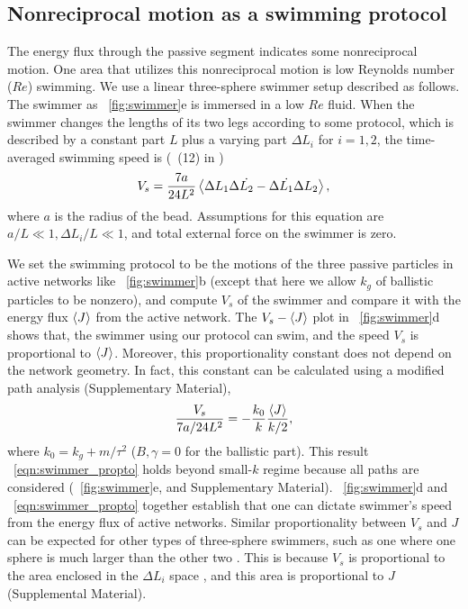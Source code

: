 \documentclass[
 preprint,
 preprintnumbers,
 amsmath,amssymb,
 aps,
 pre,
 longbibliography,
 superscriptaddress,
 10pt, twocolumn
]{revtex4-1}
\begin{document}
\subsection{Nonreciprocal motion as a swimming protocol}
The energy flux through the passive segment indicates some nonreciprocal motion. One area that utilizes this nonreciprocal motion is low Reynolds number ($Re$) swimming.
We use a linear three-sphere swimmer setup \cite{Golestanian2008AnalyticResults} described as follows. The swimmer as \figurename~\ref{fig:swimmer}e is immersed in a low $Re$ fluid. When the swimmer changes the lengths of its two legs according to some protocol, which is described by a constant part $L$ plus a varying part $\Delta L_i$ for $i=1,2$, the time-averaged swimming speed is (\eqnname~(12) in \cite{Golestanian2008AnalyticResults})
\begin{equation} \label{eqn:swimmer_speed}
    V_s = \frac{7a}{24L^2} \expval{\Delta L_1 \Delta \Dot{L_2} - \Delta \Dot{L_1} \Delta{L_2}},
\end{equation}
where $a$ is the radius of the bead. Assumptions for this equation are $a/L \ll 1, \Delta L_i/L \ll 1$, and total external force on the swimmer is zero.

We set the swimming protocol to be the motions of the three passive particles in active networks like \figurename~\ref{fig:swimmer}b (except that here we allow $k_g$ of ballistic particles to be nonzero),
and compute $V_s$ of the swimmer and compare it with the energy flux $\expval{J}$ from the active network.
The $V_s-\expval{J}$ plot in \figurename~\ref{fig:swimmer}d shows that, the swimmer using our protocol can swim, and the speed $V_s$ is proportional to $\expval{J}$. Moreover, this proportionality constant does not depend on the network geometry.
In fact, this constant can be calculated using a modified path analysis (Supplementary Material),
\begin{equation} \label{eqn:swimmer_propto}
    \frac{V_s}{7a/24L^2} = -\frac{k_0}{k} \frac{\expval{J}}{k/2},
\end{equation}
where $k_0 = k_g + m/\tau^2$ ($B,\gamma=0$ for the ballistic part).
This result \eqnname~\eqref{eqn:swimmer_propto} holds beyond small-$k$ regime because all paths are considered (\figurename~\ref{fig:swimmer}e, and Supplementary Material).
\figurename~\ref{fig:swimmer}d and \eqnname~\eqref{eqn:swimmer_propto} together establish that one can dictate swimmer's speed from the energy flux of active networks.
Similar proportionality between $V_s$ and $J$ can be expected for other types of three-sphere swimmers, such as one where one sphere is much larger than the other two \cite{Golestanian2008ThreesphereLowReynoldsnumber}. This is because $V_s$ is proportional to the area enclosed in the $\Delta L_i$ space \cite{Golestanian2009StochasticLow}, and this area is proportional to $J$ (Supplemental Material).
\end{document}
